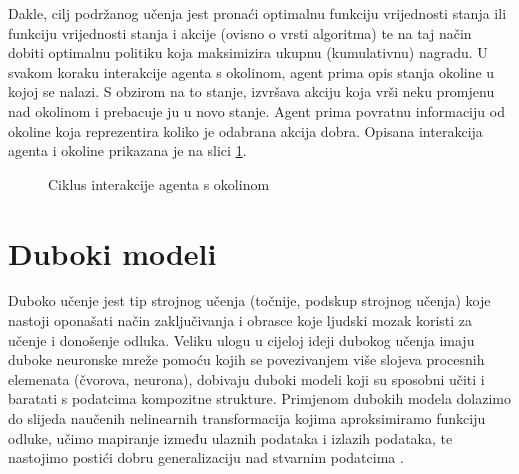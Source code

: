 Dakle, cilj podržanog učenja jest pronaći optimalnu funkciju vrijednosti stanja ili funkciju vrijednosti stanja i akcije (ovisno o vrsti algoritma) te na taj način dobiti optimalnu politiku koja maksimizira ukupnu (kumulativnu) nagradu. U svakom koraku interakcije agenta s okolinom, agent prima opis stanja okoline u kojoj se nalazi. S obzirom na to stanje, izvršava akciju koja vrši neku promjenu nad okolinom i prebacuje ju u novo stanje. Agent prima povratnu informaciju od okoline koja reprezentira koliko je odabrana akcija dobra. Opisana interakcija agenta i okoline prikazana je na slici \ref{fig:rl}.

\begin{figure}[H]
    \centering
    \caption{Ciklus interakcije agenta s okolinom \cite{wikiRL}}
    \label{fig:rl}
\end{figure}

\section{Duboki modeli}

Duboko učenje  jest tip strojnog učenja (točnije, podskup strojnog učenja) koje nastoji oponašati način zaključivanja i obrasce koje ljudski mozak koristi za učenje i donošenje odluka. Veliku ulogu u cijeloj ideji dubokog učenja imaju duboke neuronske mreže  pomoću kojih se povezivanjem više slojeva procesnih elemenata (čvorova, neurona), dobivaju duboki modeli koji su sposobni učiti i baratati s podatcima kompozitne strukture. Primjenom dubokih modela dolazimo do slijeda naučenih nelinearnih transformacija kojima aproksimiramo funkciju odluke, učimo mapiranje između ulaznih podataka i izlazih podataka, te nastojimo postići dobru generalizaciju nad stvarnim podatcima \cite{DLBook}. 

